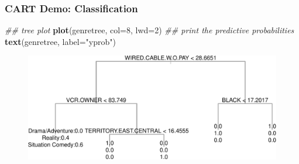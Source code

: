 \documentclass[
  shownotes,
  xcolor={svgnames},
  hyperref={colorlinks,citecolor=DarkBlue,linkcolor=DarkRed,urlcolor=DarkBlue}
  ]{beamer}
\newenvironment{Shaded}{\begin{snugshade}}{\end{snugshade}}
\newcommand{\CommentTok}[1]{\textcolor[rgb]{0.56,0.35,0.01}{\textit{#1}}}
\newcommand{\DataTypeTok}[1]{\textcolor[rgb]{0.13,0.29,0.53}{#1}}
\newcommand{\DecValTok}[1]{\textcolor[rgb]{0.00,0.00,0.81}{#1}}
\newcommand{\KeywordTok}[1]{\textcolor[rgb]{0.13,0.29,0.53}{\textbf{#1}}}
\newcommand{\NormalTok}[1]{#1}
\newcommand{\StringTok}[1]{\textcolor[rgb]{0.31,0.60,0.02}{#1}}
\begin{document}
\begin{frame}[fragile]
\frametitle{CART Demo: Classification}

\begin{scriptsize}
\begin{Shaded}
\begin{Highlighting}[]
\CommentTok{\#\# tree plot}
\KeywordTok{plot}\NormalTok{(genretree, }\DataTypeTok{col=}\DecValTok{8}\NormalTok{, }\DataTypeTok{lwd=}\DecValTok{2}\NormalTok{)}
\CommentTok{\#\# print the predictive probabilities}
\KeywordTok{text}\NormalTok{(genretree, }\DataTypeTok{label=}\StringTok{"yprob"}\NormalTok{)}
\end{Highlighting}
\end{Shaded}
\end{scriptsize}

\begin{figure}[H] \centering
            \captionsetup{justification=centering}
              \includegraphics[scale=0.55]{figures/unnamed-chunk-9-1.pdf}
 \end{figure}



\end{frame}
\end{document}
